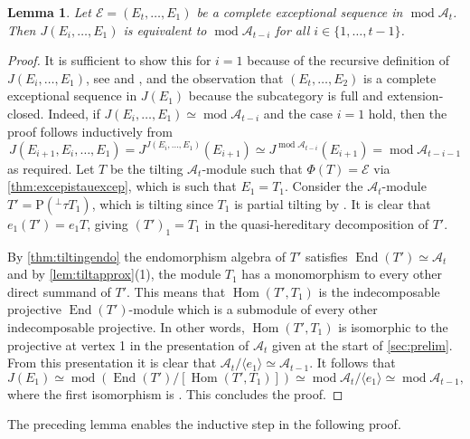 \documentclass[10pt,twoside, a4paper,reqno]{amsart}
\DeclareMathOperator{\mods}{mod}
\DeclareMathOperator{\Hom}{Hom}
\DeclareMathOperator{\End}{End}
\newcommand{\A}{\mathscr{A}}
\newcommand{\Ecal}{\mathcal{E}}
\newcommand{\Prm}{\mathrm{P}}
\newtheorem{lemma}[theorem]{Lemma}
\theoremstyle{definition}
\begin{document}
\begin{lemma}\label{lem:reduction}
    Let $\Ecal = (E_t, \dots, E_1)$ be a complete exceptional sequence in $\mods \A_t$. Then $J(E_i, \dots, E_1)$ is equivalent to $\mods \A_{t-i}$ for all $i \in \{1, \dots, {t-1}\}$. 
\end{lemma}
\begin{proof}
    It is sufficient to show this for $i=1$ because of the recursive definition of $J(E_i, \dots, E_1)$, see \cite[Thm. 1.4]{BuanMarsh2021w} and \cite[Thm. 6.4]{BuanHanson2023}, and the observation that $(E_t, \dots, E_2)$ is a complete exceptional sequence in $J(E_1)$ because the subcategory is full and extension-closed. Indeed, if $J(E_i, \dots, E_1) \simeq \mods \A_{t-i}$ and the case $i=1$ hold, then the proof follows inductively from 
    \[ J(E_{i+1}, E_i, \dots, E_1) = J^{J(E_i, \dots, E_1)}(E_{i+1}) \simeq J^{\mods \A_{t-i}}(E_{i+1}) = \mods \A_{t-i-1}\]
    as required. Let $T$ be the tilting $\A_t$-module such that $\Phi(T) = \Ecal$ via \cref{thm:excepistauexcep}, which is such that $E_1 = T_1$. Consider the $\A_t$-module $T' = \Prm(^\perp \tau T_1)$, which is tilting since $T_1$ is partial tilting by \cite[Thm. A]{LiZhang2015}. It is clear that $e_1(T') = e_1 T$, giving $(T')_1 = T_1$ in the quasi-hereditary decomposition of $T'$. 
    
    By \cref{thm:tiltingendo} the endomorphism algebra of $T'$ satisfies $\End(T') \simeq \A_t$ and by \cref{lem:tiltapprox}(1), the module $T_1$ has a monomorphism to every other direct summand of $T'$. This means that $\Hom(T',T_1)$ is the indecomposable projective $\End(T')$-module which is a submodule of every other indecomposable projective. In other words, $\Hom(T',T_1)$ is isomorphic to the projective at vertex 1 in the presentation of $\A_t$ given at the start of \cref{sec:prelim}. From this presentation it is clear that $\A_t/\langle e_1 \rangle \simeq \A_{t-1}$. It follows that
    \[ J(E_1) \simeq \mods (\End(T')/[\Hom(T', T_1)]) \simeq \mods \A_t / \langle e_1 \rangle \simeq \mods \A_{t-1}, \]
    where the first isomorphism is \cite[Thm. 3.8]{Jasso2015}. This concludes the proof.
\end{proof}

The preceding lemma enables the inductive step in the following proof.
\end{document}
